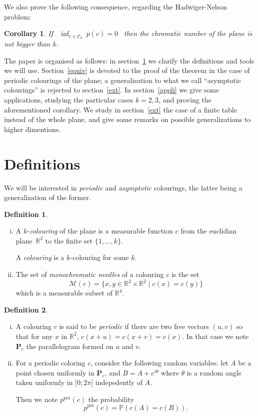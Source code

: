 \documentclass[a4paper,11pt]{article}
\newtheorem{cons}{Corollary}
\theoremstyle{definition}
\newtheorem{definition}{Definition}
\theoremstyle{remark}
\newcommand{\R}{\mathbb{R}}
\newcommand{\M}{\mathcal{M}}
\renewcommand{\Pr}{\mathbb{P}}
\renewcommand{\P}{\mathbf{P}}
\newcommand{\pper}{p^{\mathrm{per}}}
\newcommand{\Ca}{\mathcal{C}}
\begin{document}
We also prove the following consequence, regarding the Hadwiger-Nelson problem:
\begin{cons} \label{con}
If \ $\inf_{c \in \Ca_k} \ p(c) = 0$ \ then the chromatic number of the
plane is not bigger than $k$.
\end{cons}

The paper is organised as follows: in section~\ref{defsection} we clarify the
definitions and tools we will use. Section~\ref{equiv} is devoted to the proof 
of the theorem in the case of periodic colourings of the plane; a generalisation
to what we call ``asymptotic colourings'' is rejected to section~\ref{ext}.
In section~\ref{appli} we give some applications, studying the particular cases $k=2,3$,
and proving the aforementioned corollary.
We study in section~\ref{ext} the case of a finite table instead of the whole plane, 
and give some remarks on possible 
generalizations to higher dimentions.

\section{Definitions} \label{defsection}
We will be interested in \textit{periodic} and \textit{asymptotic} colourings,
the latter being a generalization of the former.
\begin{definition}
\
\begin{enumerate}[i)] 
\item A $k$-\textit{colouring} of the plane is a measurable function $c$ from the euclidian 
plane~$\R ^2$ to the finite set $\{1, \dots , k \}$.

A \textit{colouring} is a $k$-colouring for some $k$.
\item The set of \textit{monochromatic needles} of a colouring $c$ is the set
\[ \M (c) = \{x,y \in \R ^2 \times \R ^2 \mid c(x) = c(y) \} \]
which is a measurable subset of $\R ^4$.
\end{enumerate}
\end{definition}

\begin{definition}
\
\begin{enumerate}[i)] 
\item A colouring $c$ is said to be \textit{periodic} if there are two free
vectors $(u,v)$ so that for any $x$ in $\R ^2$, $c(x+u)=c(x+v)=c(x)$. In that
case we note $\P_c$ the parallelogram formed on $u$ and $v$.
\item For a periodic coloring $c$, consider the following random variables:
let $A$ be a point chosen uniformly in $\P_c$, and $B=A + e^{i \theta}$ where
$\theta$ is a random angle taken uniformly in $[0;2 \pi[$ indepedently of $A$.

Then we note $\pper(c)$ the probability
$$\pper(c) = \Pr(c(A)=c(B)).$$
\end{enumerate}
\end{definition}
\end{document}
